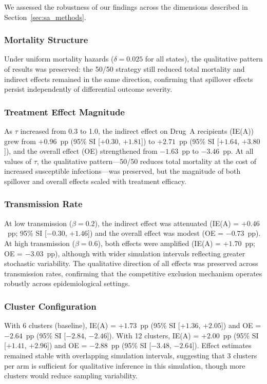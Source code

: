\documentclass[preprint,11pt]{elsarticle}
\begin{document}
We assessed the robustness of our findings across the dimensions described in Section~\ref{sec:sa_methods}.

\subsubsection{Mortality Structure}
Under uniform mortality hazards ($\delta = 0.025$ for all states), the qualitative pattern of results was preserved: the 50/50 strategy still reduced total mortality and indirect effects remained in the same direction, confirming that spillover effects persist independently of differential outcome severity.

\subsubsection{Treatment Effect Magnitude}
As $\tau$ increased from 0.3 to 1.0, the indirect effect on Drug~A recipients (IE(A)) grew from $+0.96$~pp (95\% SI [$+0.30$, $+1.81$]) to $+2.71$~pp (95\% SI [$+1.64$, $+3.80$]), and the overall effect (OE) strengthened from $-1.63$~pp to $-3.46$~pp. At all values of $\tau$, the qualitative pattern---50/50 reduces total mortality at the cost of increased susceptible infections---was preserved, but the magnitude of both spillover and overall effects scaled with treatment efficacy.

\subsubsection{Transmission Rate}
At low transmission ($\beta = 0.2$), the indirect effect was attenuated (IE(A) = $+0.46$~pp; 95\% SI [$-0.30$, $+1.46$]) and the overall effect was modest (OE = $-0.73$~pp). At high transmission ($\beta = 0.6$), both effects were amplified (IE(A) = $+1.70$~pp; OE = $-3.03$~pp), although with wider simulation intervals reflecting greater stochastic variability. The qualitative direction of all effects was preserved across transmission rates, confirming that the competitive exclusion mechanism operates robustly across epidemiological settings.

\subsubsection{Cluster Configuration}
With 6 clusters (baseline), IE(A) = $+1.73$~pp (95\% SI [$+1.36$, $+2.05$]) and OE = $-2.64$~pp (95\% SI [$-2.84$, $-2.46$]). With 12 clusters, IE(A) = $+2.00$~pp (95\% SI [$+1.41$, $+2.96$]) and OE = $-2.88$~pp (95\% SI [$-3.48$, $-2.64$]). Effect estimates remained stable with overlapping simulation intervals, suggesting that 3 clusters per arm is sufficient for qualitative inference in this simulation, though more clusters would reduce sampling variability.
\end{document}
